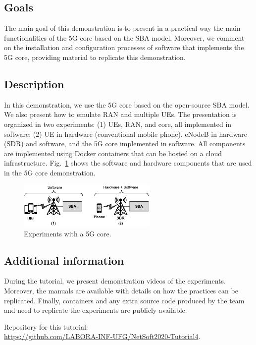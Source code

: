 \subsection*{Goals}

The main goal of this demonstration is to present in a practical way the main functionalities of the 5G core based on the SBA model. Moreover, we comment on the installation and configuration processes of software that implements the 5G core, providing material to replicate this demonstration.


\subsection*{Description}

In this demonstration, we use the 5G core based on the open-source SBA model. We also present how to emulate RAN and multiple UEs. The presentation is organized in two experiments: (1) UEs, RAN, and core, all implemented in software; (2) UE in hardware (conventional mobile phone), eNodeB in hardware (SDR) and software, and the 5G core implemented in software. All components are implemented using Docker containers that can be hosted on a cloud infrastructure. Fig.~\ref{fig:demo2} shows the software and hardware components that are used in the 5G core demonstration.

\begin{figure}[htb] 
 \begin{center}
\includegraphics[width=0.6\textwidth]{figs/demo2-en.pdf}
  \end{center}
\caption{Experiments with a 5G core.}
\label{fig:demo2}
\end{figure}


\subsection*{Additional information}

During the tutorial, we present demonstration videos of the experiments. Moreover, the manuals are available with details on how the practices can be replicated. Finally, containers and any extra source code produced by the team and need to replicate the experiments are publicly available.


Repository for this tutorial:\\
\url{https://github.com/LABORA-INF-UFG/NetSoft2020-Tutorial4}.


